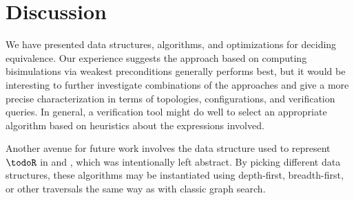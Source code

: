 \section{Discussion}

We have presented data structures, algorithms, and optimizations for
deciding \NetKAT equivalence. Our experience suggests the approach
based on computing bisimulations via weakest preconditions generally
performs best, but it would be interesting to further investigate
combinations of the approaches and give a more precise
characterization in terms of topologies, configurations, and
verification queries. In general, a verification tool might do well to
select an appropriate algorithm based on heuristics about the
expressions involved.

Another avenue for future work involves the data structure used to
represent $\todoR$ in  and ,
which was intentionally left abstract. By picking different data
structures, these algorithms may be instantiated using depth-first,
breadth-first, or other traversals the same way as with classic graph
search.
